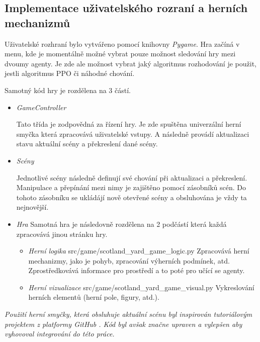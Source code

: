 \subsection{Implementace uživatelského rozraní a herních mechanizmů}

Uživatelské rozhraní bylo vytvářeno pomocí knihovny \emph{Pygame}.
Hra začíná v menu, kde je momentálně možné vybrat pouze možnost sledování hry mezi dvoumy agenty.
Je zde ale možnost vybrat jaký algoritmus rozhodování je použit, jestli algoritmus PPO či náhodné chování.

Samotný kód hry je rozdělena na 3 částí.

\begin{itemize}
  \item \emph{GameController} \cite{GameSceneController}
  
  Tato třída je zodpovědná za řízení hry.
  Je zde spuštěna univerzální herní smyčka která zpracovává uživatelské vstupy.
  A následně provádí aktualizaci stavu aktuální scény a překreslení dané scény.
  \item \emph{Scény} \cite{GameSceneController}
  
  Jednotlivé scény následně definují své chování při aktualizaci a překreslení.
  Manipulace a přepínání mezi nimy je zajištěno pomocí zásobníků scén.
  Do tohoto zásobníku se ukládájí nově otevřené scény a obsluhována je vždy ta nejnovější.

  \item \emph{Hra}
    Samotná hra je následovně rozdělena na 2 podčástí která každá zpracovává jinou stránku hry.
    \begin{itemize}
      \item \emph{Herní logika} src/game/scotland\_yard\_game\_logic.py
      Zpracovává herní mechanizmy, jako je pohyb, zpracování výherních podmínek, atd.
      Zprostředkovává informace pro prostředí a to poté pro učící se agenty.

      \item \emph{Herní vizualizace}  src/game/scotland\_yard\_game\_visual.py
      Vykreslování herních elementů (herní pole, figury, atd.).
    \end{itemize}
\end{itemize}

\textit{Použití herní smyčky, která obsluhuje aktuální scénu byl inspirován tutoriálovým projektem z platformy GitHub \cite{GameSceneController}.
Kód byl avšak značne upraven a vylepšen aby vyhovoval integrování do této práce.}

